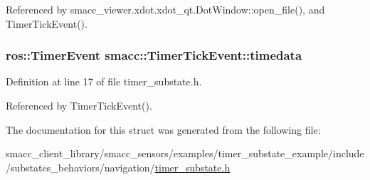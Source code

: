 Referenced by smacc\+\_\+viewer.\+xdot.\+xdot\+\_\+qt.\+Dot\+Window\+::open\+\_\+file(), and Timer\+Tick\+Event().

\subsubsection[{\texorpdfstring{timedata}{timedata}}]{\setlength{\rightskip}{0pt plus 5cm}ros\+::\+Timer\+Event smacc\+::\+Timer\+Tick\+Event\+::timedata}\hypertarget{structsmacc_1_1TimerTickEvent_afac83d8b00999b26c2365932030389e9}{}\label{structsmacc_1_1TimerTickEvent_afac83d8b00999b26c2365932030389e9}


Definition at line 17 of file timer\+\_\+substate.\+h.



Referenced by Timer\+Tick\+Event().



The documentation for this struct was generated from the following file\+:\begin{DoxyCompactItemize}
\item 
smacc\+\_\+client\+\_\+library/smacc\+\_\+sensors/examples/timer\+\_\+substate\+\_\+example/include/substates\+\_\+behaviors/navigation/\hyperlink{timer__substate_8h}{timer\+\_\+substate.\+h}\end{DoxyCompactItemize}
